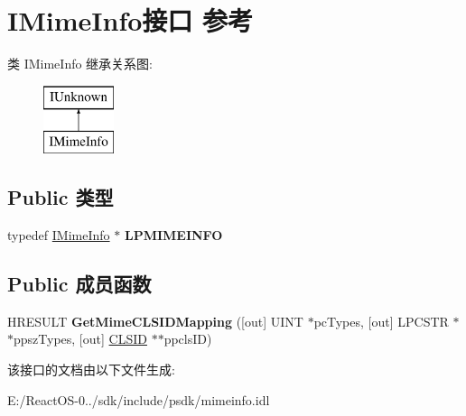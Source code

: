 \hypertarget{interface_i_mime_info}{}\section{I\+Mime\+Info接口 参考}
\label{interface_i_mime_info}
类 I\+Mime\+Info 继承关系图\+:\begin{figure}[H]
\begin{center}
\leavevmode
\includegraphics[height=2.000000cm]{interface_i_mime_info}
\end{center}
\end{figure}
\subsection*{Public 类型}
\begin{DoxyCompactItemize}
\item 
\mbox{\label{interface_i_mime_info_a0423177696f2f6638d3572e5a901a19f}} 
typedef \hyperlink{interface_i_mime_info}{I\+Mime\+Info} $\ast$ {\bfseries L\+P\+M\+I\+M\+E\+I\+N\+FO}
\end{DoxyCompactItemize}
\subsection*{Public 成员函数}
\begin{DoxyCompactItemize}
\item 
\mbox{\label{interface_i_mime_info_ad3c1e09e16a572cd5f1c910ff8f9c0a0}} 
H\+R\+E\+S\+U\+LT {\bfseries Get\+Mime\+C\+L\+S\+I\+D\+Mapping} (\mbox{[}out\mbox{]} U\+I\+NT $\ast$pc\+Types, \mbox{[}out\mbox{]} L\+P\+C\+S\+TR $\ast$$\ast$ppsz\+Types, \mbox{[}out\mbox{]} \hyperlink{struct___i_i_d}{C\+L\+S\+ID} $\ast$$\ast$ppcls\+ID)
\end{DoxyCompactItemize}


该接口的文档由以下文件生成\+:\begin{DoxyCompactItemize}
\item 
E\+:/\+React\+O\+S-\/0../sdk/include/psdk/mimeinfo.\+idl\end{DoxyCompactItemize}
